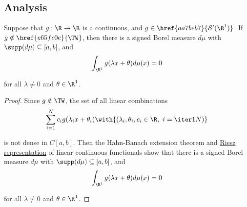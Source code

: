 \subsection{Analysis}\label{bde6bd5}

\Lemma{}\label{feb7b59}

Suppose that $g:\R\to\R$ is a continuous, and $g\in\href{aa7beb7}{\mathcal
S'(\R^1)}$. If $g\notin\href{e65fc0e}{\TW}$, then there is a signed Borel
measure $d\mu$ with $\supp(d\mu)\subseteq[a,b]$, and
$$
  \int_{\R^1}g(\lambda x+\theta)d\mu(x)=0
$$

for all $\lambda\neq0$ and $\theta\in\R^1$.

\begin{proof}
  Since $g\notin\TW$, the set of all linear combinations
  $$
    \sum_{i=1}^Nc_ig(\lambda_ix+\theta_i)\with{(\lambda_i,\theta_i,c_i\in\R,\ i=\iter1N)}
  $$

  is not dense in $C[a,b]$. Then the Hahn-Banach extension theorem and
  \href{d9bde94}{Riesz representation} of linear continuous functionals show
  that there is a signed Borel measure $d\mu$ with $\supp(d\mu)\subseteq[a,b]$,
  and
  $$
    \int_{\R^1}g(\lambda x+\theta)d\mu(x)=0
  $$

  for all $\lambda\neq0$ and $\theta\in\R^1$.
\end{proof}
